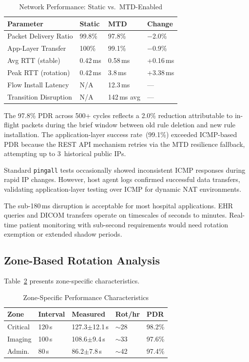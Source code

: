 \documentclass[conference]{IEEEtran}
\begin{document}
\begin{table}[htbp]
\caption{Network Performance: Static vs.\ MTD-Enabled}
\label{tab:performance}
\centering
\footnotesize
\begin{tabular}{p{2.2cm}p{1.5cm}p{1.7cm}p{1.2cm}}
\toprule
\textbf{Parameter} & \textbf{Static} & \textbf{MTD} & \textbf{Change} \\
\midrule
Packet Delivery Ratio & 99.8\% & 97.8\% & $-$2.0\% \\
App-Layer Transfer & 100\% & 99.1\% & $-$0.9\% \\
Avg RTT (stable) & 0.42\,ms & 0.58\,ms & +0.16\,ms \\
Peak RTT (rotation) & 0.42\,ms & 3.8\,ms & +3.38\,ms \\
Flow Install Latency & N/A & 12.3\,ms & --- \\
Transition Disruption & N/A & 142\,ms avg & --- \\
\bottomrule
\end{tabular}
\end{table}

The 97.8\% PDR across 500+ cycles reflects a 2.0\% reduction attributable to in-flight packets during the brief window between old rule deletion and new rule installation. The application-layer success rate~(99.1\%) exceeded ICMP-based PDR because the REST API mechanism retries via the MTD resilience fallback, attempting up to 3~historical public IPs.

Standard \texttt{pingall} tests occasionally showed inconsistent ICMP responses during rapid IP changes. However, host agent logs confirmed successful data transfers, validating application-layer testing over ICMP for dynamic NAT environments.

The sub-180\,ms disruption is acceptable for most hospital applications. EHR queries and DICOM transfers operate on timescales of seconds to minutes. Real-time patient monitoring with sub-second requirements would need rotation exemption or extended shadow periods.

\subsection{Zone-Based Rotation Analysis}

Table~\ref{tab:zone_perf} presents zone-specific characteristics.

\begin{table}[htbp]
\caption{Zone-Specific Performance Characteristics}
\label{tab:zone_perf}
\centering
\footnotesize
\begin{tabular}{lllll}
\toprule
\textbf{Zone} & \textbf{Interval} & \textbf{Measured} & \textbf{Rot/hr} & \textbf{PDR} \\
\midrule
Critical & 120\,s & 127.3$\pm$12.1\,s & $\sim$28 & 98.2\% \\
Imaging & 100\,s & 108.6$\pm$9.4\,s & $\sim$33 & 97.6\% \\
Admin. & 80\,s & 86.2$\pm$7.8\,s & $\sim$42 & 97.4\% \\
\bottomrule
\end{tabular}
\end{table}
\end{document}
